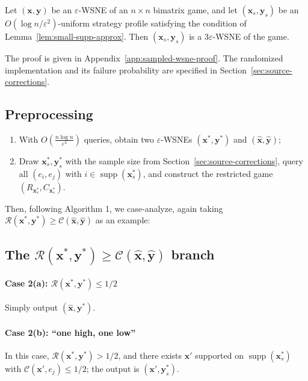 \begin{lemma}
  \label{lem:3_eps-wsne-samling}
  Let $(\mathbf{x}, \mathbf{y})$ be an $\varepsilon$-WSNE of an $n \times n$ bimatrix game, and let $(\mathbf{x}_s, \mathbf{y}_s)$ be an $O(\log n / \varepsilon^2)$-uniform strategy profile satisfying the condition of Lemma~\ref{lem:small-supp-approx}. Then $(\mathbf{x}_s, \mathbf{y}_s)$ is a $3\varepsilon$-WSNE of the game.
\end{lemma}

The proof is given in Appendix~\ref{app:sampled-wsne-proof}. The randomized implementation and its failure probability are specified in Section~\ref{sec:source-corrections}.

\subsection{Preprocessing}

\begin{enumerate}
  \item With $O\left(\frac{n \log n}{\varepsilon^4}\right)$ queries, obtain two $\varepsilon$-WSNEs $(\mathbf{x}^*, \mathbf{y}^*)$ and $(\hat{\mathbf{x}}, \hat{\mathbf{y}})$;
  \item Draw $\mathbf{x}_s^*, \mathbf{y}_s^*$ with the sample size from Section~\ref{sec:source-corrections}, query all $(e_i, e_j)$ with $i \in \operatorname{supp}(\mathbf{x}_s^*)$, and construct the restricted game $(R_{\mathbf{x}_s^*}, C_{\mathbf{x}_s^*})$.
\end{enumerate}

Then, following Algorithm 1, we case-analyze, again taking $\mathcal{R}(\mathbf{x}^*,\mathbf{y}^*) \ge \mathcal{C}(\hat{\mathbf{x}},\hat{\mathbf{y}})$ as an example:

\subsection{The \texorpdfstring{$\mathcal{R}(\mathbf{x}^*, \mathbf{y}^*) \ge \mathcal{C}(\hat{\mathbf{x}}, \hat{\mathbf{y}})$}{R(x*,y*) >= C(xh,yh)} branch}

\paragraph{Case 2(a): $\mathcal{R}(\mathbf{x}^*,\mathbf{y}^*) \le 1/2$}
Simply output $(\hat{\mathbf{x}}, \mathbf{y}^*)$.

\paragraph{Case 2(b): ``one high, one low''}
In this case, $\mathcal{R}(\mathbf{x}^*,\mathbf{y}^*) > 1/2$, and there exists $\mathbf{x}'$ supported on $\operatorname{supp}(\mathbf{x}_s^*)$ with $\mathcal{C}(\mathbf{x}', e_j) \le 1/2$; the output is $(\mathbf{x}', \mathbf{y}_s^*)$.

